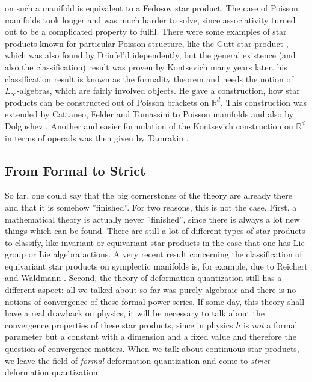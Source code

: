 on such a manifold is equivalent to a Fedosov star product. The case of Poisson 
manifolds took longer and was much harder to solve, since associativity turned 
out to be a complicated property to fulfil. There were some examples of star 
products known for particular Poisson structure, like the Gutt star product 
\cite{gutt:1983a}, which was also found by Drinfel'd \cite{drinfeld:1983a} 
idependently, but the general existence (and also the classification) result was 
proven by Kontsevich \cite{kontsevich:1997:pre, kontsevich:2003a} many years 
later. his classification result is known as the formality theorem and needs the 
notion of $L_{\infty}$-algebras, which are fairly involved objects. He gave a 
construction, how star products can be constructed out of Poisson brackets on 
$\mathbb{R}^d$. This construction was extended by Cattaneo, Felder and Tomassini 
to Poisson manifolds \cite{cattaneo.felder.tomassini:2002b} and also by 
Dolgushev \cite{dolgushev:2005a}. Another and easier formulation of the 
Kontsevich construction on $\mathbb{R}^d$ in terms of operads was then given by 
Tamrakin \cite{tamarkin:2003a}.



\subsection{From Formal to Strict}
\label{subsec:chap2_Formal2Strict}

So far, one could say that the big cornerstones of the theory are already there 
and that it is somehow ''finished''. For two reasons, this is not the case. 
First, a mathematical theory is actually never ''finished'', since there is 
always a lot new things which can be found. There are still a lot of different 
types of star products to classify, like invariant or equivariant star products 
in the case that one has Lie group or Lie algebra actions. A very recent result 
concerning the classification of equivariant star products on symplectic 
manifolds is, for example, due to Reichert and Waldmann 
\cite{reichert.waldmann:2015a:pre}. Second, the theory of deformation 
quantization still has a different aspect: all we talked about so far was purely 
algebraic and there is no notions of convergence of these formal power series. 
If some day, this theory shall have a real drawback on physics, it will be 
necessary to talk about the convergence properties of these star products, since 
in physics $\hbar$ is \emph{not} a formal parameter but a constant with a 
dimension and a fixed value and therefore the question of convergence matters. 
When we talk about continuous star products, we leave the field of \emph{formal} 
deformation quantization and come to \emph{strict} deformation quantization.


